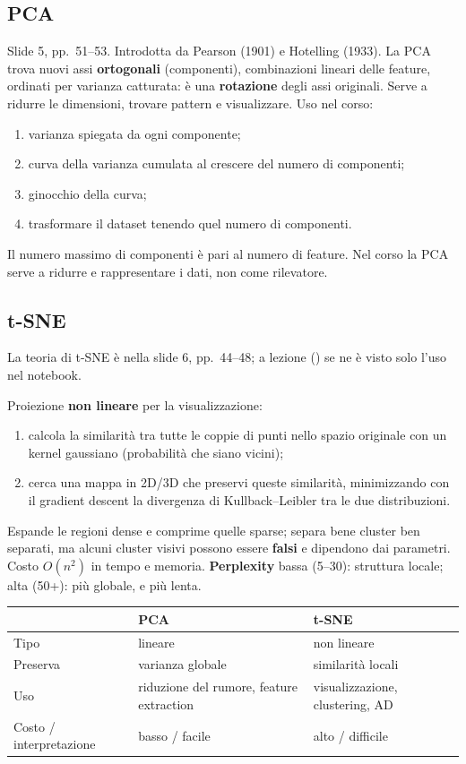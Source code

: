 \subsection{PCA}
Slide 5, pp.\ 51--53. Introdotta da Pearson (1901) e Hotelling (1933). La PCA trova nuovi assi \textbf{ortogonali} (componenti), combinazioni
lineari delle feature, ordinati per varianza catturata: è una \textbf{rotazione} degli assi originali. Serve a ridurre le dimensioni, trovare
pattern e visualizzare. Uso nel corso:
\begin{enumerate}
  \item varianza spiegata da ogni componente;
  \item curva della varianza cumulata al crescere del numero di componenti;
  \item ginocchio della curva;
  \item trasformare il dataset tenendo quel numero di componenti.
\end{enumerate}
Il numero massimo di componenti è pari al numero di feature. Nel corso la PCA serve a ridurre e rappresentare i dati, non come rilevatore.

\subsection{t-SNE}
\begin{nota}
La teoria di t-SNE è nella slide 6, pp.\ 44--48; a lezione () se ne è visto solo l'uso nel notebook.
\end{nota}
Proiezione \textbf{non lineare} per la visualizzazione:
\begin{enumerate}
  \item calcola la similarità tra tutte le coppie di punti nello spazio originale con un kernel gaussiano (probabilità che siano vicini);
  \item cerca una mappa in 2D/3D che preservi queste similarità, minimizzando con il gradient descent la divergenza di
        Kullback--Leibler tra le due distribuzioni.
\end{enumerate}
Espande le regioni dense e comprime quelle sparse; separa bene cluster ben separati, ma alcuni cluster visivi possono essere
\textbf{falsi} e dipendono dai parametri. Costo $O(n^2)$ in tempo e memoria. \textbf{Perplexity} bassa (5--30): struttura locale; alta (50+):
più globale, e più lenta.
\begin{center}
\small
\begin{tabular}{@{}lll@{}}
\toprule
 & \textbf{PCA} & \textbf{t-SNE}\\
\midrule
Tipo & lineare & non lineare\\
Preserva & varianza globale & similarità locali\\
Uso & riduzione del rumore, feature extraction & visualizzazione, clustering, AD\\
Costo / interpretazione & basso / facile & alto / difficile\\
\bottomrule
\end{tabular}
\end{center}

